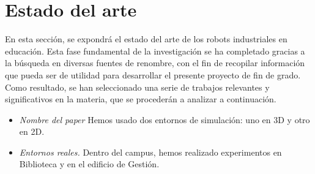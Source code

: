 \chapter{Estado del arte}
\label{cap:capitulo2}
En esta sección, se expondrá el estado del arte de los robots industriales en educación. Esta fase fundamental de la 
investigación se ha completado gracias a la búsqueda en diversas fuentes de renombre, con el fin de 
recopilar información que pueda ser de utilidad para desarrollar el presente proyecto de fin de grado. Como resultado, se 
han seleccionado una serie de trabajos relevantes y significativos en la materia, que se procederán a analizar a continuación.
\begin{itemize}
    \item \textit{Nombre del paper} Hemos usado dos entornos de simulación: uno en 3D y otro en 2D.
    \item \textit{Entornos reales.} Dentro del campus, hemos realizado experimentos en Biblioteca y en el edificio de Gestión.
   \end{itemize}\
\vspace{1cm}
